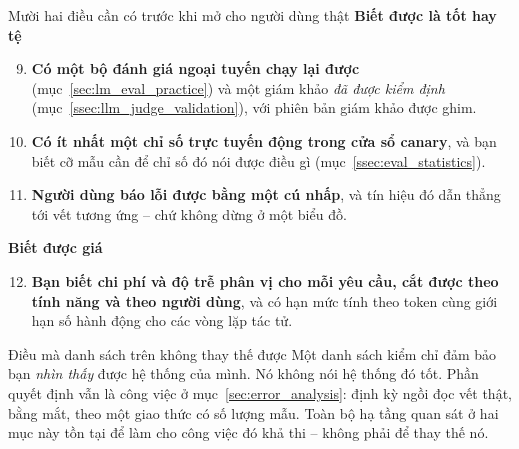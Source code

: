 \begin{checklist}{Mười hai điều cần có trước khi mở cho người dùng thật}
\textbf{Biết được là tốt hay tệ}
\begin{enumerate}\setcounter{enumi}{8}
	\item \textbf{Có một bộ đánh giá ngoại tuyến chạy lại được} (mục~\ref{sec:lm_eval_practice}) và một giám khảo \emph{đã được kiểm định} (mục~\ref{ssec:llm_judge_validation}), với phiên bản giám khảo được ghim.
	\item \textbf{Có ít nhất một chỉ số trực tuyến động trong cửa sổ canary}, và bạn biết cỡ mẫu cần để chỉ số đó nói được điều gì (mục~\ref{ssec:eval_statistics}).
	\item \textbf{Người dùng báo lỗi được bằng một cú nhấp}, và tín hiệu đó dẫn thẳng tới vết tương ứng -- chứ không dừng ở một biểu đồ.
\end{enumerate}

\textbf{Biết được giá}
\begin{enumerate}\setcounter{enumi}{11}
	\item \textbf{Bạn biết chi phí và độ trễ phân vị cho mỗi yêu cầu, cắt được theo tính năng và theo người dùng}, và có hạn mức tính theo token cùng giới hạn số hành động cho các vòng lặp tác tử.
\end{enumerate}
\end{checklist}

\begin{pitfall}{Điều mà danh sách trên không thay thế được}
Một danh sách kiểm chỉ đảm bảo bạn \emph{nhìn thấy} được hệ thống của mình. Nó không nói hệ thống đó tốt. Phần quyết định vẫn là công việc ở mục~\ref{sec:error_analysis}: định kỳ ngồi đọc vết thật, bằng mắt, theo một giao thức có số lượng mẫu. Toàn bộ hạ tầng quan sát ở hai mục này tồn tại để làm cho công việc đó khả thi -- không phải để thay thế nó.
\end{pitfall}
